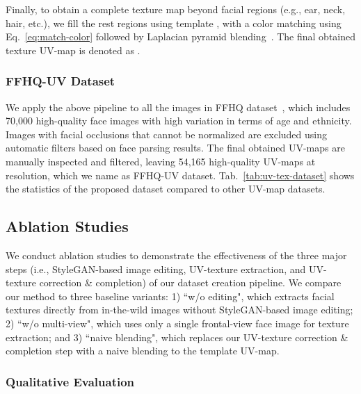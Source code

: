 \documentclass[10pt,twocolumn,letterpaper]{article}
\begin{document}
Finally, to obtain a complete texture map beyond facial regions (e.g., ear, neck, hair, etc.), we fill the rest regions using template , with a color matching using Eq.~\eqref{eq:match-color} followed by Laplacian pyramid blending~\cite{burt1983multiresolution}. 
The final obtained texture UV-map is denoted as .


\vspace{-3mm}
\subsubsection{FFHQ-UV Dataset}
\label{sec:ffhq-uv-dataset}
\vspace{-2mm}


We apply the above pipeline to all the images in FFHQ dataset~\cite{karras2019style}, which includes 70,000 high-quality face images with high variation in terms of age and ethnicity.
Images with facial occlusions that cannot be normalized are excluded using automatic filters based on face parsing results. 
The final obtained UV-maps are manually inspected and filtered, leaving 54,165 high-quality UV-maps at  resolution, which we name as FFHQ-UV dataset.
Tab.~\ref{tab:uv-tex-dataset} shows the statistics of the proposed dataset compared to other UV-map datasets. 



\subsection{Ablation Studies}
\label{sec:dataset-ana}


We conduct ablation studies to demonstrate the effectiveness of the three major steps (i.e., StyleGAN-based image editing, UV-texture extraction, and UV-texture correction \& completion) of our dataset creation pipeline.
We compare our method to three baseline variants: 
1) ``w/o editing", which extracts facial textures directly from in-the-wild images without StyleGAN-based image editing; 
2) ``w/o multi-view", which uses only a single frontal-view face image for texture extraction; 
and 3) ``naive blending", which replaces our UV-texture correction \& completion step with a naive blending to the template UV-map.


\vspace{-4mm}
\subsubsection{Qualitative Evaluation}
\vspace{-1mm}
\end{document}
